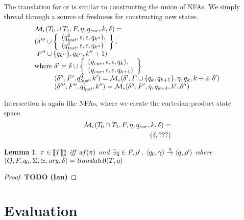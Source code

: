 \documentclass[preprint,onecolumn,9pt]{sigplanconf} %
\newtheorem{lemma}{Lemma}
\begin{document}
The translation for or is similar to constructing the union of NFAs.
%
We simply thread through a source of freshness for constructing new states.
%
\begin{align*}
  \begin{array}{l}
  \epshelp(\stOr{\mtcon_0}{\mtcon_1}, F, \mtimeline, \pmsmqcur, k, \delta) = \\
    (\delta''' \cup
    \left\{\begin{array}{l}
        (\pmsmqlast^0, \epsilon, \epsilon, \pmsmq_{k''}), \\
        (\pmsmqlast^1, \epsilon, \epsilon, \pmsmq_{k''})
      \end{array}\right\}, \\
    \ F'' \cup \setof{\pmsmq_{k''}}, \pmsmq_{k''}, k''+ 1)
    \\
    \text{where } \delta' = \delta \cup \left\{
      \begin{array}{l}
        (\pmsmqcur, \epsilon, \epsilon, \pmsmq_k),\\
        (\pmsmqcur, \epsilon, \epsilon, \pmsmq_{k+1})
      \end{array}\right\}
    \\
    \phantom{\text{where }} (\delta'', F', \pmsmqlast^0, k') = \epshelp(\delta', F \cup \setof{\pmsmq_k, \pmsmq_{k+1}}, \mtimeline, \pmsmq_k, k+2, \delta') \\
    \phantom{\text{where }} (\delta''', F'', \pmsmqlast^1, k'') = \epshelp(\delta'', F', \mtimeline, \pmsmq_{k+1}, k', \delta'')
  \end{array}
\end{align*}

Intersection is again like NFAs, where we create the cartesian-product state space.
%
\begin{align*}
  {\mathcal M}_\epsilon(T_0 \cap T_1, F, \eta, q_\mathit{cur}, k, \delta) = \\
  (\delta, ???)
\end{align*}
%
\begin{lemma}
  $\pi \in [\![ T ]\!]^{\eta}_{\rho}$ iff $\mathit{wf}(\pi)$ and $\exists q \in F, \rho'$. $\langle q_0, \gamma \rangle \overset{\pi}{\to} \langle q, \rho' \rangle$ where $(Q, F, q_0, \Sigma, \simeq, \mathit{ary}, \delta) = \mathit{translate}0(T, \eta)$
\end{lemma}
\begin{proof}
  \textbf{TODO (Ian)}
\end{proof}
\section{Evaluation}
\end{document}
